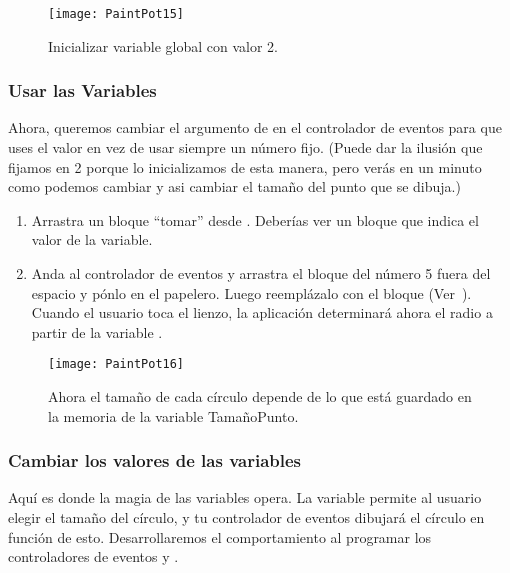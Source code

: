 \begin{figure}[H]
\centering
\texttt{[image: PaintPot15]}
\caption{Inicializar variable global  con valor 2.}
\label{fig:PaintPot15}
\end{figure}

\subsubsection*{Usar las Variables}

Ahora, queremos cambiar el argumento de
 en el controlador de eventos
 para que uses el valor
 en vez de usar siempre un número fijo. (Puede
dar la ilusión que fijamos  en 2 porque lo
inicializamos de esta manera, pero verás en un minuto como podemos
cambiar  y asi cambiar el tamaño del punto que
se dibuja.)

\begin{enumerate}
\item Arrastra un bloque ``tomar'' desde
  . Deberías ver un bloque
   que indica el valor de la variable.

\item Anda al controlador de eventos  y
  arrastra el bloque del número 5 fuera del espacio  y
  pónlo en el papelero.  Luego reemplázalo con el bloque  (Ver~). Cuando el usuario
  toca el lienzo, la aplicación determinará ahora el radio a partir de
  la variable .
\end{enumerate}

\begin{figure}[H]
\vspace{3em}
\centering
\texttt{[image: PaintPot16]}
\caption{Ahora el tamaño de cada círculo depende de lo
que está guardado en la memoria de la variable TamañoPunto.}
\label{fig:PaintPot16}
\end{figure}

\subsubsection*{Cambiar los valores de las variables}

Aquí es donde la magia de las variables opera. La variable
 permite al usuario elegir el tamaño del
círculo, y tu controlador de eventos dibujará el círculo en función de
esto.  Desarrollaremos el comportamiento al programar los
controladores de eventos  y
.

